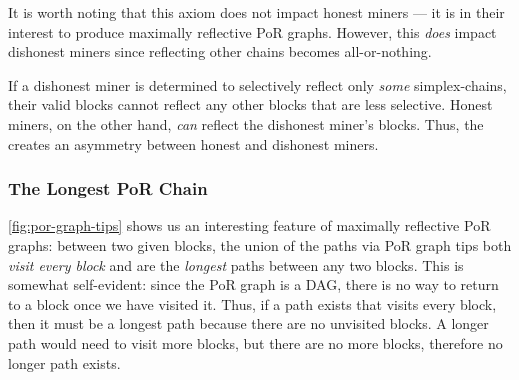


It is worth noting that this axiom does not impact honest miners --- it is in their interest to produce maximally reflective PoR graphs.
However, this \emph{does} impact dishonest miners since reflecting other chains becomes all-or-nothing.

If a dishonest miner is determined to selectively reflect only \emph{some} simplex-chains, their valid blocks cannot reflect any other blocks that are less selective.
Honest miners, on the other hand, \emph{can} reflect the dishonest miner's blocks.
Thus, the \AxiomOfMaximalReflection creates an asymmetry between honest and dishonest miners.



\subsubsection{The Longest PoR Chain}

\autoref{fig:por-graph-tips} shows us an interesting feature of maximally reflective PoR graphs: between two given blocks, the union of the paths via PoR graph tips both \emph{visit every block} and are the \emph{longest} paths between any two blocks.
This is somewhat self-evident: since the PoR graph is a DAG, there is no way to return to a block once we have visited it.
Thus, if a path exists that visits every block, then it must be a longest path because there are no unvisited blocks.
A longer path would need to visit more blocks, but there are no more blocks, therefore no longer path exists.

